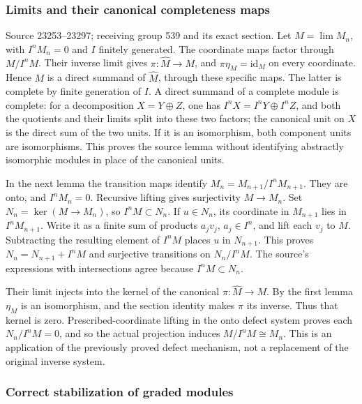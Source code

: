 \subsubsection{Limits and their canonical completeness maps}\label{limits-and-their-canonical-completeness-maps}

Source 23253--23297; receiving group 539 and its exact section. Let \(M=\lim M_n\), with \(I^nM_n=0\) and \(I\) finitely generated. The coordinate maps factor through \(M/I^nM\). Their inverse limit gives \(\pi:\widehat M\to M\), and \(\pi\eta_M=\mathrm{id}_M\) on every coordinate. Hence \(M\) is a direct summand of \(\widehat M\), through these specific maps. The latter is complete by finite generation of \(I\). A direct summand of a complete module is complete: for a decomposition \(X=Y\oplus Z\), one has \(I^nX=I^nY\oplus I^nZ\), and both the quotients and their limits split into these two factors; the canonical unit on \(X\) is the direct sum of the two units. If it is an isomorphism, both component units are isomorphisms. This proves the source lemma without identifying abstractly isomorphic modules in place of the canonical units.

In the next lemma the transition maps identify \(M_n=M_{n+1}/I^nM_{n+1}\). They are onto, and \(I^nM_n=0\). Recursive lifting gives surjectivity \(M\to M_n\). Set \(N_n=\ker(M\to M_n)\), so \(I^nM\subset N_n\). If \(u\in N_n\), its coordinate in \(M_{n+1}\) lies in \(I^nM_{n+1}\). Write it as a finite sum of products \(a_jv_j\), \(a_j\in I^n\), and lift each \(v_j\) to \(M\). Subtracting the resulting element of \(I^nM\) places \(u\) in \(N_{n+1}\). This proves \(N_n=N_{n+1}+I^nM\) and surjective transitions on \(N_n/I^nM\). The source's expressions with intersections agree because \(I^nM\subset N_n\).

Their limit injects into the kernel of the canonical \(\pi:\widehat M\to M\). By the first lemma \(\eta_M\) is an isomorphism, and the section identity makes \(\pi\) its inverse. Thus that kernel is zero. Prescribed-coordinate lifting in the onto defect system proves each \(N_n/I^nM=0\), and so the actual projection induces \(M/I^nM\cong M_n\). This is an application of the previously proved defect mechanism, not a replacement of the original inverse system.

\subsubsection{Correct stabilization of graded modules}\label{correct-stabilization-of-graded-modules}


